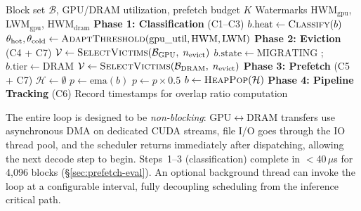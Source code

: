 \documentclass[conference]{IEEEtran}
\begin{document}
\begin{algorithm}[t]
\caption{Per-Step Scheduling Loop (C8: Tiered Manager)}
\label{alg:schedule}
\begin{algorithmic}[1]
\Require Block set $\mathcal{B}$, GPU/DRAM utilization, prefetch budget $K$
\Require Watermarks HWM$_{\text{gpu}}$, LWM$_{\text{gpu}}$, HWM$_{\text{dram}}$
\Statex
\Statex \textbf{Phase 1: Classification} (C1--C3)
 
    \State $b.\text{heat} \gets \Call{Classify}{b}$ 
\EndFor
\State $\theta_{\text{hot}}, \theta_{\text{cold}} \gets \Call{AdaptThreshold}{\text{gpu\_util}, \text{HWM}, \text{LWM}}$ 
\Statex
\Statex \textbf{Phase 2: Eviction} (C4 + C7)
 
    \State $\mathcal{V} \gets \Call{SelectVictims}{\mathcal{B}_{\text{GPU}},\; n_{\text{evict}}}$ 
        \State {}
        \State $b.\text{state} \gets \text{MIGRATING}$
        \State {} 
        \State {}; $b.\text{tier} \gets \text{DRAM}$
        \State {}
    \EndFor
\EndIf
{} 
    \State $\mathcal{V} \gets \Call{SelectVictims}{\mathcal{B}_{\text{DRAM}},\; n_{\text{evict}}}$
    \State {} 
\EndIf
\Statex
\Statex \textbf{Phase 3: Prefetch} (C5 + C7)
\State $\mathcal{H} \gets \emptyset$ 
    \State $p \gets \text{ema}(b)$ 
     $p \gets p \times 0.5$ 
    \EndIf
    \State {}
\EndFor
{} 
    \State $b \gets \Call{HeapPop}{\mathcal{H}}$
    \State {} 
\EndFor
\Statex
\Statex \textbf{Phase 4: Pipeline Tracking} (C6)
\State Record timestamps for overlap ratio computation
\end{algorithmic}
\end{algorithm}

The entire loop is designed to be \emph{non-blocking}: GPU$\leftrightarrow$DRAM transfers use asynchronous DMA on dedicated CUDA streams, file I/O goes through the IO thread pool, and the scheduler returns immediately after dispatching, allowing the next decode step to begin. Steps~1--3 (classification) complete in $<$40\,$\mu$s for 4,096 blocks (\S\ref{sec:prefetch-eval}). An optional background thread can invoke the loop at a configurable interval, fully decoupling scheduling from the inference critical path.
\end{document}
